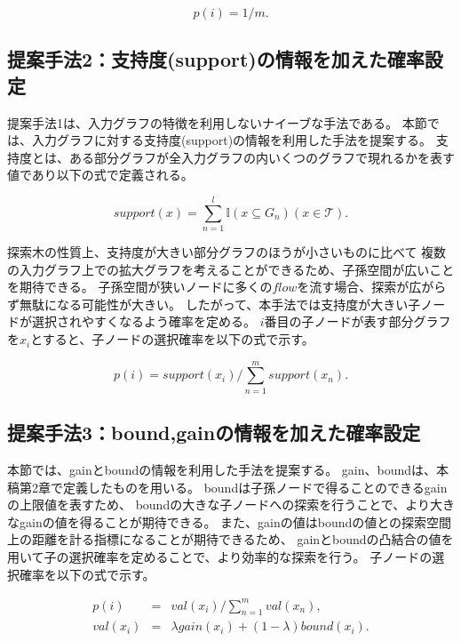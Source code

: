 \begin{equation}
	p(i) = 1 / m.
\end{equation}

\subsection{提案手法2：支持度(support)の情報を加えた確率設定}
提案手法1は、入力グラフの特徴を利用しないナイーブな手法である。
本節では、入力グラフに対する支持度(support)の情報を利用した手法を提案する。
支持度とは、ある部分グラフが全入力グラフの内いくつのグラフで現れるかを表す値であり以下の式で定義される。

\begin{equation}
	support(x) = \sum_{n=1}^{l} \mathbb{I} (x \subseteq G_n) (x \in \mathcal{T}).
\end{equation}

探索木の性質上、支持度が大きい部分グラフのほうが小さいものに比べて
複数の入力グラフ上での拡大グラフを考えることができるため、子孫空間が広いことを期待できる。
子孫空間が狭いノードに多くの$flow$を流す場合、探索が広がらず無駄になる可能性が大きい。
したがって、本手法では支持度が大きい子ノードが選択されやすくなるよう確率を定める。
$i$番目の子ノードが表す部分グラフを$x_i$とすると、子ノードの選択確率を以下の式で示す。

\begin{equation}
	p(i) = support(x_i) / \sum_{n=1}^{m} support(x_n).
\end{equation}

\subsection{提案手法3：bound,gainの情報を加えた確率設定}
本節では、gainとboundの情報を利用した手法を提案する。
gain、boundは、本稿第2章で定義したものを用いる。
boundは子孫ノードで得ることのできるgainの上限値を表すため、
boundの大きな子ノードへの探索を行うことで、より大きなgainの値を得ることが期待できる。
また、gainの値はboundの値との探索空間上の距離を計る指標になることが期待できるため、
gainとboundの凸結合の値を用いて子の選択確率を定めることで、より効率的な探索を行う。
子ノードの選択確率を以下の式で示す。

\begin{eqnarray}
	p(i) & = & val(x_i) / \sum_{n=1}^{m} val(x_n), \\
	val(x_i) & = & \lambda gain(x_i) + ( 1 - \lambda ) bound(x_i). \nonumber 
\end{eqnarray}

